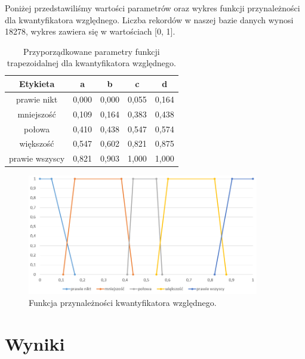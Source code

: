 \documentclass{classrep}
\begin{document}
	Poniżej przedstawiliśmy wartości parametrów oraz wykres funkcji przynależności dla kwantyfikatora względnego. Liczba rekordów w naszej bazie danych wynosi 18278, wykres zawiera się w wartościach [0, 1].
	\begin{table}[h!]
		\centering
		\begin{tabular} {c c c c c}
			\hline
			\textbf{Etykieta} & \textbf{a} & \textbf{b} & \textbf{c} & \textbf{d} \\ [0.5ex] 
			\hline	
			\hline 
			prawie nikt			 & 0,000 & 0,000 & 0,055 & 0,164 \\
			mniejszość			 & 0,109 & 0,164 & 0,383 & 0,438  \\
			połowa				 & 0,410 & 0,438 & 0,547 & 0,574  \\
			większość 		 	 & 0,547 & 0,602 & 0,821 & 0,875  \\	
			prawie wszyscy		 & 0,821 & 0,903 & 1,000 & 1,000  \\						
			\hline			
		\end{tabular}
		\caption{Przyporządkowane parametry funkcji trapezoidalnej dla kwantyfikatora względnego. }
		\label{tabelaKwantyfikatorWzgledny}
	\end{table}
	
	\begin{figure}[h!]
		\centering
		\includegraphics[width=0.9\textwidth]{kwantyfikatorWzgledny.png}
		\caption{Funkcja przynależności kwantyfikatora względnego.}
		\label{kwantyfikatorWzgledny}
	\end{figure}
	
	\newpage
	\section{Wyniki} %
	
\end{document}
